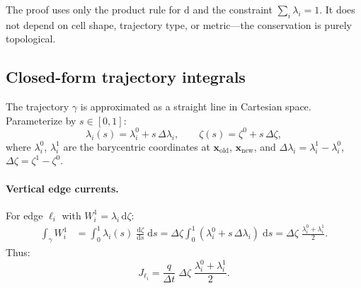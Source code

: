 \documentclass[11pt,a4paper]{article}
\newcommand{\dd}{\mathrm{d}}
\begin{document}
The proof uses only the product rule for $\dd$ and the constraint
$\sum_i \lambda_i = 1$. It does not depend on cell shape, trajectory type,
or metric---the conservation is purely topological.

\subsection{Closed-form trajectory integrals}
\label{sec:closed_form}

The trajectory $\gamma$ is approximated as a straight line in Cartesian space.
Parameterize by $s \in [0,1]$:
\begin{equation}
  \lambda_i(s) = \lambda_i^0 + s\,\Delta\lambda_i, \qquad
  \zeta(s) = \zeta^0 + s\,\Delta\zeta,
  \label{eq:trajectory}
\end{equation}
where $\lambda_i^0$, $\lambda_i^1$ are the barycentric coordinates at
$\bm{x}_\text{old}$, $\bm{x}_\text{new}$, and
$\Delta\lambda_i = \lambda_i^1 - \lambda_i^0$,
$\Delta\zeta = \zeta^1 - \zeta^0$.

\paragraph{Vertical edge currents.}
For edge $\ell_i$ with $W^1_i = \lambda_i\,\dd\zeta$:
\begin{align}
  \int_\gamma W^1_i
    &= \int_0^1 \lambda_i(s)\;\frac{\dd\zeta}{\dd s}\;\dd s
    = \Delta\zeta \int_0^1 (\lambda_i^0 + s\,\Delta\lambda_i)\;\dd s
    = \Delta\zeta\;\frac{\lambda_i^0 + \lambda_i^1}{2}.
\end{align}
Thus:
\begin{equation}
  \boxed{
    J_{\ell_i} = \frac{q}{\Delta t}\;\Delta\zeta\;
      \frac{\lambda_i^0 + \lambda_i^1}{2}.
  }
  \label{eq:J_vert}
\end{equation}
\end{document}

